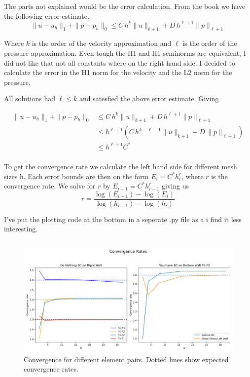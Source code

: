 \documentclass[a4paper,12pt]{article}
\theoremstyle{exerciseStyle}
\theoremstyle{solutionStyle}
\begin{document}
\begin{solution}{6.7}
    The parts not explained would be the error calculation.
    From the book we have the following error estimate.
    \[
        \|u - u_h\|_1 + \|p - p_h\|_0 \le C\,h^k \|u\|_{k+1} + D\,h^{\ell+1} \|p\|_{\ell+1}
    \]

    Where \(k\) is the order of the velocity approximation and \(\ell\) is the order of the pressure approximation.
    Even tough the H1 and H1 seminorms are equivalent, I did not like that not all constants
    where on the right hand side. I decided to calculate the error in the H1 norm for the velocity and the L2 norm for the pressure.

    All solutions had \( \ell \le k\) and satesfied the above error estimate. Giving

    \begin{align*}
        \|u - u_h\|_1 + \|p - p_h\|_0 & \le C\,h^k \|u\|_{k+1} + D\,h^{\ell+1} \|p\|_{\ell+1}                               \\
                                      & \le h^{\ell+1} \left(  C\,h^{k - \ell - 1} \|u\|_{k+1} + D\, \|p\|_{\ell+1} \right) \\
                                      & \le h^{\ell+1}  C^*                                                                 \\
    \end{align*}


    To get the convergence rate we calculate the left hand side for different mesh sizes h.
    Each error bounds are then on the form \(E_i = C^* h_i^r\), where \(r\) is the convergence rate.
    We solve for \(r\) by \(E_{i-1} = C^* h_{i-1}^r\) giving us
    \[
        r = \frac{\log(E_{i-1}) - \log(E_i)}{\log(h_{i-1}) - \log(h_i)}
    \]


    I've put the plotting code at the bottom in a seperate .py file as a i find it less interesting.
    \inputminted[linenos, breaklines, frame=lines]{python}{ex67.py}
\end{solution}


\begin{figure}[h]
    \centering
    \centering
    \includegraphics[width=1.1\linewidth]{figs/convergence_rates.png}
    \caption{Convergence for different element pairs. Dotted lines show expected convergence rates.}
    \label{fig:ex66}
\end{figure}
\end{document}
